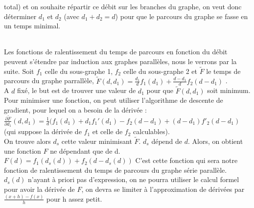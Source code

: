 \documentclass{article}
\begin{document}
total) et on souhaite répartir ce débit sur les branches du graphe, on veut donc
déterminer $d_1$ et $d_2$ (avec $d_1+d_2=d$) pour que le parcours du graphe se
fasse en un temps minimal.\\
\\
Les fonctions de ralentissement du temps de parcours en fonction du débit peuvent
s'étendre par induction aux graphes parallèles, nous le verrons par la suite.
Soit $f_1$ celle du sous-graphe 1, $f_2$ celle du sous-graphe 2 et
$\widetilde{F}$ le temps de parcours du graphe parrallèle,
$\widetilde{F}(d,d_1) = \frac{d_1}{d}f_1(d_1)+\frac{d-d_1}{d}f_2(d-d_1)$ .\\A $d$ fixé, le but est de
trouver une valeur de $d_1$ pour que $\widetilde{F}(d,d_1)$ soit
minimum. Pour minimiser une fonction, on peut utiliser l'algorithme de
descente de gradient, pour lequel on a besoin de la dérivée :
$\frac{\partial \widetilde{F}}{\partial d_1}(d,d_1) = \frac{1}{d}(f_1(d_1) + d_1 f_1'(d_1) - f_2(d-d_1) + (d-d_1)f'_2(d-d_1)$
(qui suppose la dérivée de $f_1$ et celle de $f_2$ calculables).\\
On trouve alors $d_s$ cette valeur minimisant $\widetilde{F}$. $d_s$ dépend de
$d$. Alors, on obtient une fonction $F$ ne dépendant que de d.
$F(d)=f_1(d_s(d))+f_2(d-d_s(d))$
C'est cette fonction qui sera notre fonction de ralentissement du temps de parcours
du graphe série parallèle. $d_s(d)$ n'ayant à priori pas d'expression,
on ne pourra utiliser le calcul formel pour avoir la dérivée de $F$, on devra se
limiter à l'approximation de dérivées par $\frac{(x+h)-f(x)}{h}$ pour h assez
petit.
\end{document}
